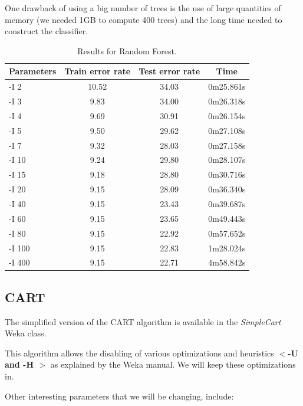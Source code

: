 \documentclass[a4paper]{llncs}
\begin{document}
One drawback of using a big number of trees is the use of large
quantities of memory (we needed 1GB to compute 400 trees) and the long time needed to construct the classifier.

\begin{table}[ht]
  \begin{center}
  \begin{tabular}{ | l | c | c | c |}
    \hline
    \textbf{Parameters} & \textbf{Train error rate} & \textbf{Test error rate} & \textbf{Time} \\ \hline
    -I 2 & 10.52 & 34.03 & 0m25.861s \\ \hline
    -I 3 & 9.83 & 34.00 & 0m26.318s \\ \hline
    -I 4 & 9.69 & 30.91 & 0m26.154s \\ \hline
    -I 5 & 9.50 & 29.62 & 0m27.108s \\ \hline
    -I 7 & 9.32 & 28.03 & 0m27.158s \\ \hline
    -I 10 & 9.24 & 29.80 & 0m28.107s \\ \hline
    -I 15 & 9.18 & 28.80 & 0m30.716s \\ \hline
    -I 20 & 9.15 & 28.09 & 0m36.340s \\ \hline
    -I 40 & 9.15 & 23.43 & 0m39.687s \\ \hline
    -I 60 & 9.15 & 23.65 & 0m49.443s \\ \hline
    -I 80 & 9.15 & 22.92 & 0m57.652s \\ \hline
    -I 100 & 9.15 & 22.83 & 1m28.024s \\ \hline
    -I 400 & 9.15 & 22.71 & 4m58.842s \\ \hline
  \end{tabular}
  \caption{Results for Random Forest.}
  \label{tbl:results_random_forest}
  \end{center}
\end{table}

\subsection{CART}

The simplified version of the CART algorithm is available
in the \textit{SimpleCart} Weka class.

This algorithm allows the disabling of various optimizations
and heuristics \textbf{$<$-U and -H $>$} as explained by the Weka manual.
We will keep these optimizations in.

Other interesting parameters that we will be changing, include:
\end{document}
